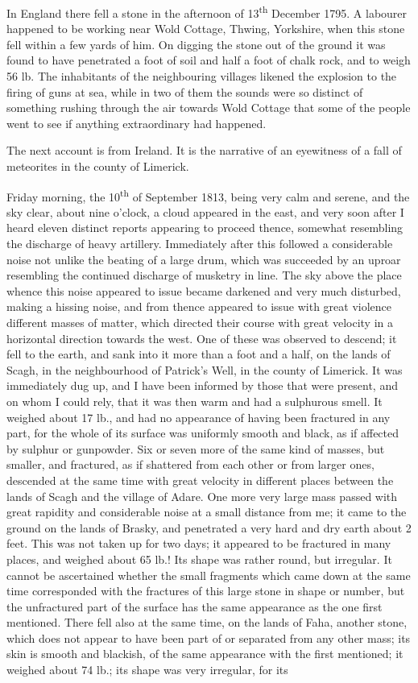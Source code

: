 \documentclass[a4paper, 12pt, oneside, polutonikogreek, english]{article}
\begin{document}
In England there fell a stone in the afternoon of 13\textsuperscript{th} December 1795. A labourer happened to be working near Wold Cottage, Thwing, Yorkshire, when this stone fell within a few yards of him. On digging the stone out of the ground it was found to have penetrated a foot of soil and half a foot of chalk rock, and to weigh 56 lb. The inhabitants of the neighbouring villages likened the explosion to the firing of guns at sea, while in two of them the sounds were so distinct of something rushing through the air towards Wold Cottage that some of the people went to see if anything extraordinary had happened.

The next account is from Ireland. It is the narrative of an eyewitness of a fall of meteorites in the county of Limerick.

Friday morning, the 10\textsuperscript{th} of September 1813, being very calm and serene, and the sky clear, about nine o'clock, a cloud appeared in the east, and very soon after I heard eleven distinct reports appearing to proceed thence, somewhat resembling the discharge of heavy artillery. Immediately after this followed a considerable noise not unlike the beating of a large drum, which was succeeded by an uproar resembling the continued discharge of musketry in line. The sky above the place whence this noise appeared to issue became darkened and very much disturbed, making a hissing noise, and from thence appeared to issue with great violence different masses of matter, which directed their course with great velocity in a horizontal direction towards the west. One of these was observed to descend; it fell to the earth, and sank into it more than a foot and a half, on the lands of Scagh, in the neighbourhood of Patrick's Well, in the county of Limerick. It was immediately dug up, and I have been informed by those that were present, and on whom I could rely, that it was then warm and had a sulphurous smell. It weighed about 17 lb., and had no appearance of having been fractured in any part, for the whole of its surface was uniformly smooth and black, as if affected by sulphur or gunpowder. Six or seven more of the same kind of masses, but smaller, and fractured, as if shattered from each other or from larger ones, descended at the same time with great velocity in different places between the lands of Scagh and the village of Adare. One more very large mass passed with great rapidity and considerable noise at a small distance from me; it came to the ground on the lands of Brasky, and penetrated a very hard and dry earth about 2 feet. This was not taken up for two days; it appeared to be fractured in many places, and weighed about 65 lb.! Its shape was rather round, but irregular. It cannot be ascertained whether the small fragments which came down at the same time corresponded with the fractures of this large stone in shape or number, but the unfractured part of the surface has the same appearance as the one first mentioned. There fell also at the same time, on the lands of Faha, another stone, which does not appear to have been part of or separated from any other mass; its skin is smooth and blackish, of the same appearance with the first mentioned; it weighed about 74 lb.; its shape was very irregular, for its 
\end{document}
